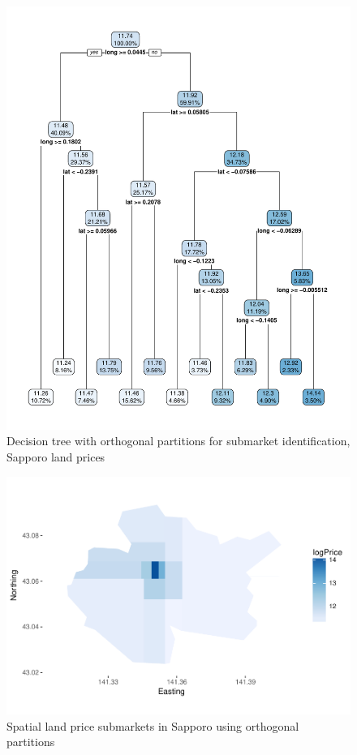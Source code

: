 \documentclass[]{elsarticle} %
\makeatletter
\def\maxwidth{\ifdim\Gin@nat@width>\linewidth\linewidth
\else\Gin@nat@width\fi}
\let\Oldincludegraphics\includegraphics
\renewcommand{\includegraphics}[1]{\Oldincludegraphics[width=\maxwidth]{#1}}
\makeatother
\begin{document}
\begin{figure}[htbp]
\centering
\includegraphics{Trees_with_Base_Functions_files/figure-latex/fig17-tree-orthogonal-sapporo-1.pdf}
\caption{\label{fig:fig17-tree-orthogonal-sapporo}Decision tree with
orthogonal partitions for submarket identification, Sapporo land prices}
\end{figure}

\begin{figure}[htbp]
\centering
\includegraphics{Trees_with_Base_Functions_files/figure-latex/fig18-map-orthogonal-sapporo-1.pdf}
\caption{\label{fig:fig18-map-orthogonal-sapporo}Spatial land price
submarkets in Sapporo using orthogonal partitions}
\end{figure}
\end{document}
